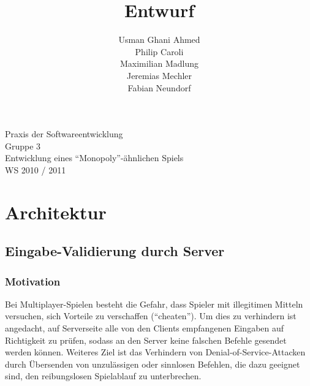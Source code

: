 \documentclass[a4paper,10pt]{article}
\title{Entwurf}
\date{}
\author{Usman Ghani Ahmed \\
Philip Caroli\\
Maximilian Madlung\\ 
Jeremias Mechler\\ 
Fabian Neundorf}
\begin{document}
 
\vspace{5cm}
\maketitle
\begin{center}
\vspace{3cm}
\huge{Praxis der Softwareentwicklung \\
Gruppe 3 \\[0.5cm]
Entwicklung eines "`Monopoly"'-ähnlichen Spiels \\[0.5cm]
WS 2010 / 2011} \\[2cm]
\end{center}

\newpage

\tableofcontents

\newpage

\section{Architektur}

\subsection{Eingabe-Validierung durch Server}
\subsubsection{Motivation}
Bei Multiplayer-Spielen besteht die Gefahr, dass Spieler mit illegitimen Mitteln versuchen, sich Vorteile zu verschaffen ("`cheaten"'). Um dies zu verhindern ist angedacht, auf Serverseite alle von den Clients empfangenen Eingaben auf Richtigkeit zu prüfen, sodass an den Server keine falschen Befehle gesendet werden können. Weiteres Ziel ist das Verhindern von Denial-of-Service-Attacken durch Übersenden von unzulässigen oder sinnlosen Befehlen, die dazu geeignet sind, den reibungslosen Spielablauf zu unterbrechen. 
\end{document}
